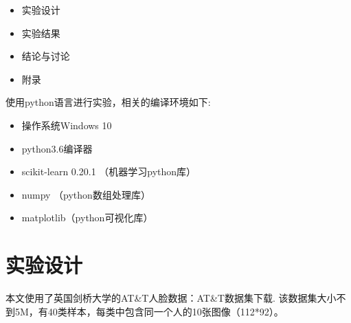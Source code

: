 \documentclass[UTF8]{ctexart}
\begin{document}
\begin{itemize}
	\item 实验设计
	\item 实验结果
	\item 结论与讨论
	\item 附录
\end{itemize}
\vspace{3mm}


使用python语言进行实验，相关的编译环境如下:
	\begin{itemize}
		\item 操作系统Windows 10
		\item python3.6编译器
		\item scikit-learn 0.20.1 （机器学习python库）
		\item numpy （python数组处理库）
		\item matplotlib（python可视化库）
	\end{itemize}



\newpage
\section{实验设计}

本文使用了英国剑桥大学的AT\&T人脸数据：AT\&T数据集下载. 该数据集大小不到5M，有40类样本，每类中包含同一个人的10张图像（112*92）。 \vspace{3mm}
\end{document}

